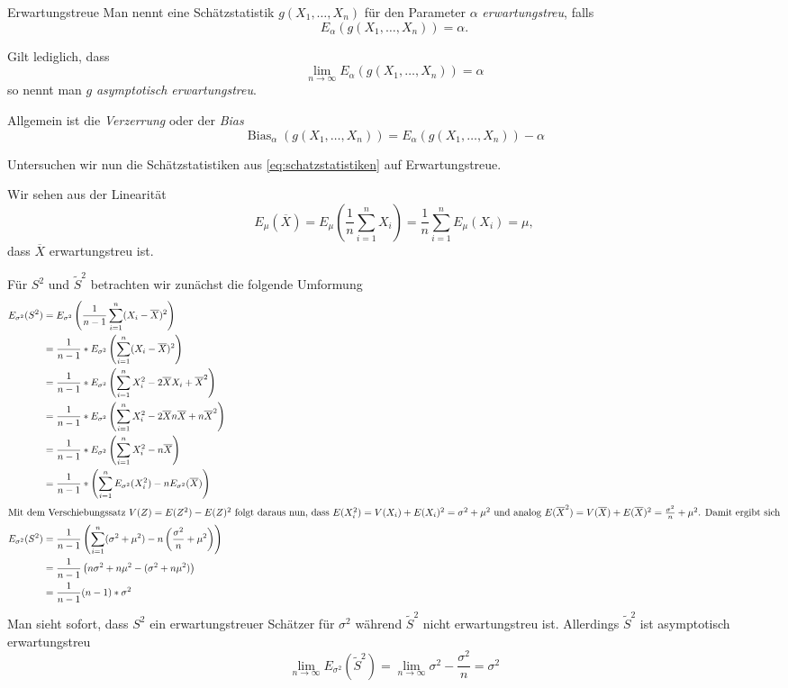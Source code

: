 \begin{definition}{Erwartungstreue}
	Man nennt eine Schätzstatistik $g(X_1,\ldots,X_n)$ für den Parameter $\alpha$ \emph{erwartungstreu}, falls
	\begin{equation*}
		E_\alpha(g(X_1,\ldots,X_n))=\alpha.
	\end{equation*}
	
	Gilt lediglich, dass
	\begin{equation*}
		\lim_{n\to\infty} E_\alpha(g(X_1,\ldots,X_n))=\alpha
	\end{equation*}
	so nennt man $g$ \emph{asymptotisch erwartungstreu}.

	Allgemein ist die \emph{Verzerrung} oder der \emph{Bias}
	\begin{equation*}
		\operatorname{Bias}_\alpha (g(X_1,\ldots,X_n))=E_\alpha(g(X_1,\ldots,X_n))-\alpha
	\end{equation*}
\end{definition}
Untersuchen wir nun die Schätzstatistiken aus \autoref{eq:schatzstatistiken} auf Erwartungstreue.

Wir sehen aus der Linearität
\begin{equation*}
	E_\mu(\overline X)=E_\mu\left( \frac1n\sum_{i=1}^n X_i \right)=\frac1n\sum_{i=1}^n E_\mu(X_i)=\mu,
\end{equation*}
dass $\overline X$ erwartungstreu ist.

Für $S^2$ und $\tilde S^2$ betrachten wir zunächst die folgende Umformung
\begin{align*}
	E_{\sigma^2}(S^2)&=E_{\sigma^2}\left( \frac{1}{n-1}\sum_{i=1}^n (X_i-\overline X)^2 \right)\\
	&=\frac{1}{n-1} * E_{\sigma^2}\left( \sum_{i=1}^n (X_i-\overline X)^2 \right)\\
	&=\frac{1}{n-1} * E_{\sigma^2}\left( \sum_{i=1}^n X_i^2- 2\overline X X_i +\overline X^2 \right)\\
	&=\frac{1}{n-1} * E_{\sigma^2}\left( \sum_{i=1}^n X_i^2- 2\overline X n\overline X +n\overline X^2 \right)\\
	&=\frac{1}{n-1} * E_{\sigma^2}\left( \sum_{i=1}^n X_i^2- n\overline X \right)\\
	&=\frac{1}{n-1} * \left(\sum_{i=1}^n E_{\sigma^2}(  X_i^2 )- n E_{\sigma^2}(\overline X ) \right)\\
	\intertext{Mit dem Verschiebungssatz $V(Z)=E(Z^2)-E(Z)^2$ folgt daraus nun, dass $E(X_i^2)=V(X_i)+E(X_i)^2=\sigma^2+\mu^2$ und analog $E(\overline X^2)=V(\overline X)+E(\overline X)^2=\frac{\sigma^2}{n}+\mu^2$. Damit ergibt sich}
	E_{\sigma^2}(S^2)&=\frac{1}{n-1} \left(\sum_{i=1}^n (\sigma^2+\mu^2)-n\left(\frac{\sigma^2}{n}+\mu^2\right)\right)\\
	&=\frac{1}{n-1} \left(n\sigma^2+n\mu^2-(\sigma^2+n\mu^2)\right) \\
	&=\frac{1}{n-1} (n-1)*\sigma^2
\end{align*}
Man sieht sofort, dass $S^2$ ein erwartungstreuer Schätzer für $\sigma^2$ während $\tilde S^2$ nicht erwartungstreu ist. Allerdings $\tilde S^2$ ist asymptotisch erwartungstreu
\begin{equation*}
 	\lim_{n\to\infty} E_{\sigma^2}(\tilde S^2)=\lim_{n\to\infty} \sigma^2-\frac{\sigma^2}n=\sigma^2
\end{equation*} 

